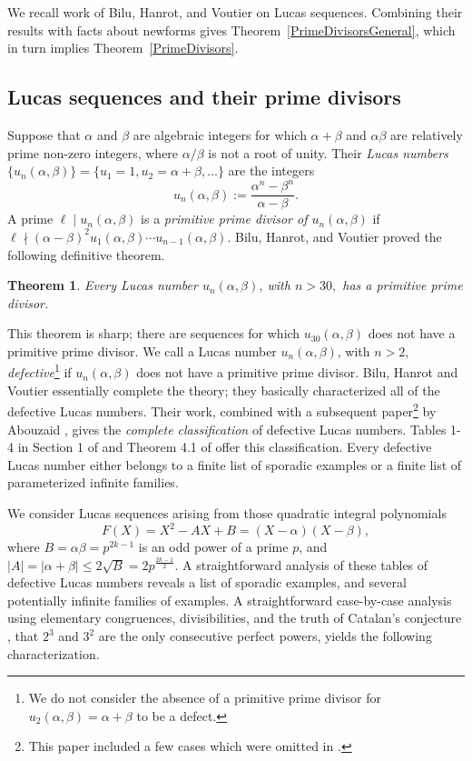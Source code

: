 \documentclass[12pt]{amsart}
\newtheorem{thm}{Theorem}[section]
\newcommand{\?}{\color{red}?}
\numberwithin{equation}{section}
\begin{document}
We recall work of Bilu, Hanrot, and Voutier \cite{BHV} on Lucas sequences.
Combining their results with facts about newforms gives Theorem~\ref{PrimeDivisorsGeneral}, which in turn
implies Theorem~\ref{PrimeDivisors}.

\subsection{Lucas sequences and their prime divisors}

Suppose that $\alpha$ and $\beta$ are algebraic integers for which $\alpha+\beta$ and $\alpha \beta$
are relatively prime non-zero integers, where $\alpha/\beta$ is not a root of unity.
Their {\it Lucas numbers} $\{u_n(\alpha,\beta)\}=\{u_1=1, u_2=\alpha+\beta,\dots\}$ are the integers
\begin{equation}
u_n(\alpha,\beta):=\frac{\alpha^n-\beta^n}{\alpha-\beta}.
\end{equation}
A prime  $\ell \mid u_{n}(\alpha,\beta)$ is a {\it primitive prime divisor of $u_n(\alpha,\beta)$} if $\ell \nmid (\alpha-\beta)^2 u_1(\alpha,\beta)\cdots u_{n-1}(\alpha, \beta)$.
Bilu, Hanrot, and Voutier \cite{BHV} proved the following definitive theorem. 

\begin{thm}\label{Bilu}
Every Lucas number $u_n(\alpha,\beta)$, with $n>30,$
has a primitive prime divisor.
\end{thm}

This theorem is sharp; there are sequences for which $u_{30}(\alpha,\beta)$
does not have a primitive prime divisor. 
We call a Lucas number $u_n(\alpha,\beta)$, with $n>2,$ {\it defective}\footnote{We do not consider the absence of
a primitive prime divisor for $u_2(\alpha,\beta)=\alpha+\beta$ to be   a defect.}  if $u_{n}(\alpha,\beta)$ does 
not have a primitive prime divisor. Bilu, Hanrot and Voutier essentially complete the theory; they basically
characterized all of the defective Lucas numbers.
 Their work, combined with a subsequent paper\footnote{This paper included a few cases which were omitted in \cite{BHV}.} 
by Abouzaid \cite{Abouzaid},   gives the {\it complete classification} of
defective Lucas numbers.
Tables 1-4 in Section 1 of \cite{BHV} and Theorem 4.1 of \cite{Abouzaid} offer this
classification. Every defective Lucas number either belongs to a  finite list of sporadic examples or
a finite list of parameterized infinite families.

We consider Lucas sequences  arising from those quadratic integral polynomials
\begin{equation}\label{Modularity}
F(X)=X^2-AX+B=(X-\alpha)(X-\beta),
\end{equation}
where $B=\alpha \beta =p^{2k-1}$ is an odd power of a prime $p$, and $|A|=|\alpha+\beta|\leq 2\sqrt{B}=2p^{\frac{2k-1}{2}}.$ 
 A straightforward analysis of these tables of defective Lucas numbers reveals a list of sporadic examples, and several potentially infinite families of examples.  A straightforward case-by-case analysis using elementary congruences, divisibilities, and the truth of Catalan's conjecture \cite{Catalan},
that $2^3$ and $3^2$ are the only consecutive perfect powers,
yields the following characterization.
\end{document}
